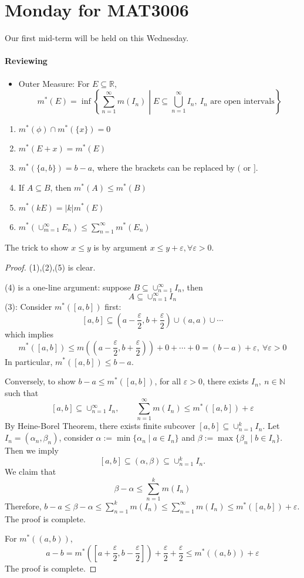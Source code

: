 \section{Monday for MAT3006}
Our first mid-term will be held on this Wednesday.
\paragraph{Reviewing}
\begin{itemize}
\item
Outer Measure: For $E\subseteq\mathbb{R}$,
\[
m^*(E)=\inf\left\{
\sum_{n=1}^\infty m(I_n)\middle|
E\subseteq\bigcup_{n=1}^\infty I_n,\ \text{$I_n$ are open intervals}
\right\}
\]
\end{itemize}
\begin{proposition}
\begin{enumerate}
\item
$m^*(\phi)\cap m^*(\{x\})=0$
\item
$m^*(E+x) = m^*(E)$
\item
$m^*(\{a,b\}) = b-a$, where the brackets can be replaced by $($ or $]$.
\item
If $A\subseteq B$, then $m^*(A)\le m^*(B)$
\item
$m^*(kE) = |k|m^*(E)$
\item
$m^*(\cup_{m=1}^\infty E_n)\le \sum_{n=1}^\infty m^*(E_n)$
\end{enumerate}
\end{proposition}
The trick to show $x\le y$ is by argument $x\le y+\varepsilon,\forall \varepsilon>0$.
\begin{proof}
(1),(2),(5) is clear.

(4) is a one-line argument: suppose $B\subseteq\cup_{n=1}^\infty I_n$, then
\[
A\subseteq\cup_{n=1}^\infty I_n
\]
(3): Consider $m^*([a,b])$ first:
\[
[a,b]\subseteq(a-\frac{\varepsilon}{2},b+\frac{\varepsilon}{2})\cup(a,a)\cup\cdots
\]
which implies 
\[
m^*([a,b])\le m((a-\frac{\varepsilon}{2},b+\frac{\varepsilon}{2}))+0+\cdots+0=(b-a)+\varepsilon,\ \forall\varepsilon>0
\]
In particular, $m^*([a,b])\le b-a$.

Conversely, to show $b-a\le m^*([a,b])$, for all $\varepsilon>0$, there exists $I_n, \ n\in\mathbb{N}$ such that
\[
[a,b]\subseteq \cup_{n=1}^\infty I_n,\qquad
\sum_{n=1}^\infty m(I_n)\le m^*([a,b])+\varepsilon
\]
By Heine-Borel Theorem, there exists finite subcover $[a,b]\subseteq \cup_{n=1}^k I_n$.
Let $I_n = (\alpha_n,\beta_n)$, consider $\alpha:=\min\{\alpha_n\mid a\in I_n\}$ and $\beta:=\max\{\beta_n\mid b\in I_n\}$.
Then we imply 
\[
[a,b]\subseteq(\alpha,\beta)\subseteq \cup_{n=1}^kI_n.
\]
We claim that
\[
\beta - \alpha\le \sum_{n=1}^km(I_n)
\]
Therefore, $b-a\le \beta-\alpha\le \sum_{n=1}^km(I_n)\le\sum_{n=1}^\infty m(I_n)\le m^*([a,b])+\varepsilon$.
The proof is complete.

For $m^*((a,b))$, 
\[
a-b = m^*([a+\frac{\varepsilon}{2},b-\frac{\varepsilon}{2}]) + \frac{\varepsilon}{2}+\frac{\varepsilon}{2}
\le
m^*((a,b))+\varepsilon
\]
The proof is complete.
\end{proof}
